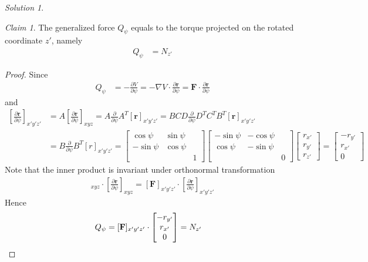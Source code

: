 \documentclass[twoside,11pt]{article}
\theoremstyle{definition}
\theoremstyle{remark}
\newtheorem*{solution}{Solution}
\newtheorem*{claim}{Claim}
\begin{document}
\begin{solution}
\begin{claim}
The generalized force $Q_\psi$ equals to the torque projected on the rotated
coordinate $z'$, namely
\begin{align*}
    Q_\psi &= N_{z'}
\end{align*}
\end{claim}
\begin{proof}
Since
\begin{align*}
    Q_\psi &= -\frac{\partial V}{\partial\psi}
    = -\nabla V\cdot\frac{\partial \mathbf{r}}{\partial\psi}
    = \mathbf F\cdot\frac{\partial \mathbf{r}}{\partial\psi}
\end{align*}
and
\begin{align*}
    \left[\frac{\partial\mathbf{r}}{\partial \psi}\right]_{x'y'z'} 
    &= A\left[\frac{\partial\mathbf{r}}{\partial \psi}\right]_{xyz}
    = A\frac{\partial}{\partial\psi} A^T[\mathbf{r}]_{x'y'z'}
    = BCD\frac{\partial}{\partial\psi} D^TC^TB^T[\mathbf{r}]_{x'y'z'}\\
    &= B\frac{\partial}{\partial\psi}B^T[r]_{x'y'z'}
    = \begin{bmatrix}
        \cos\psi & \sin\psi & \\
        -\sin\psi & \cos\psi & \\
                  &  & 1
    \end{bmatrix}
    \begin{bmatrix}
        -\sin\psi & -\cos\psi & \\
        \cos\psi & -\sin\psi & \\
                 & & 0
    \end{bmatrix}
    \begin{bmatrix}
        r_{x'} \\ r_{y'} \\ r_{z'}
    \end{bmatrix}
    = \begin{bmatrix}
        -r_{y'}\\ r_{x'}\\ 0
    \end{bmatrix}
\end{align*}
Note that the inner product is invariant under orthonormal transformation
\begin{align*}
    [\mathbf{F}]_{xyz}\cdot\left[\frac{\partial\mathbf{r}}{\partial\psi}\right]_{xyz}
    = 
    [\mathbf{F}]_{x'y'z'}\cdot\left[\frac{\partial\mathbf{r}}{\partial\psi}\right]_{x'y'z'}
\end{align*}
Hence 
\begin{align*}
    Q_\psi &= [\mathbf{F}]_{x'y'z'}\cdot
    \begin{bmatrix}
        -r_{y'}\\ r_{x'}\\ 0
    \end{bmatrix}
    = N_{z'}\qedhere
\end{align*}
\end{proof}


\end{solution}
\end{document}

